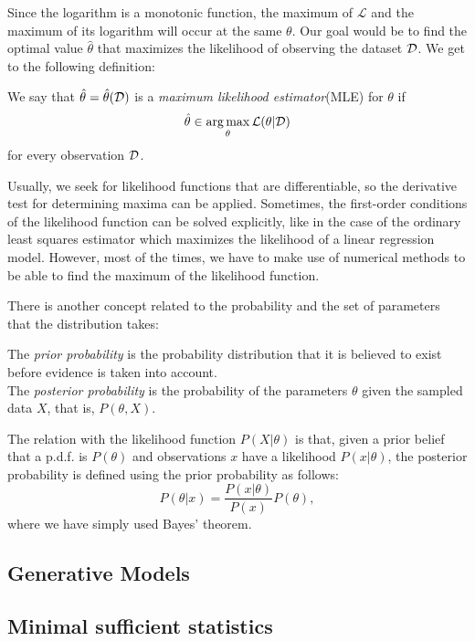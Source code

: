 Since the logarithm is a monotonic function, the maximum of $\mathcal L$ and the maximum of its logarithm will occur at the same $\theta$.   Our goal would be to find the optimal value $\hat{\theta}$ that maximizes the likelihood of observing the dataset $\mathcal{D}$. We get to the following definition:

\begin{ndef}
    We say that $\hat{\theta} = \hat\theta (\mathcal{D})$ is a \emph{maximum likelihood estimator}(MLE) for $\theta$ if  
    $$
    \hat\theta \in \operatorname*{arg\,max}_{\theta} \mathcal L(\theta | \mathcal{D})
    $$
    for every observation $\mathcal{D}$. 
\end{ndef}

Usually, we seek for likelihood functions that are differentiable, so the derivative test for determining maxima can be applied. Sometimes, the first-order conditions of the likelihood function can be solved explicitly, like in the case of the ordinary least squares estimator which maximizes the likelihood of a linear regression model. However, most of the times, we have to make use of numerical methods to be able to find the maximum of the likelihood function.

There is another concept related to the probability and the set of parameters that the distribution takes:
\begin{ndef}
The \emph{prior probability} is the probability distribution that it is believed to exist before evidence is taken into account.\\

The \emph{posterior probability} is the probability of the parameters $\theta$ given the sampled data $X$, that is, $P(\theta,X)$.
\end{ndef}
The relation with the likelihood function $P(X|\theta)$ is that, given a prior belief that a p.d.f. is $P(\theta)$ and observations $x$ have a likelihood $P(x|\theta)$, the posterior probability is defined using the prior probability as follows:
\[
P(\theta|x) = \frac{P(x|\theta)}{P(x)} P(\theta),   
\]
where we have simply used Bayes' theorem.


\subsection{Generative Models}


\subsection{Minimal sufficient statistics}


